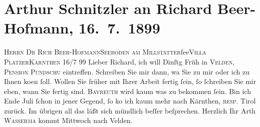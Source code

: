 

         
         \renewcommand{\erwaehntePersonen}{Personen: Richard Beer-Hofmann, Jakob Wassermann}
         \renewcommand{\erwaehnteOrte}{Orte: Bayreuth, Kärnten, Pension Pundschu, Seeboden, Tirol, Velden am Wörthersee, Villa Platzer, Wien}
         \renewcommand{\erwaehnteWerke}{}
               \section[Arthur Schnitzler an Richard Beer-Hofmann, 16. 7. 1899]{ Arthur Schnitzler an Richard Beer-Hofmann, 16. 7. 1899}\nopagebreak{}\rehead{ }\begin{ledgroupsized}[t]{13cm}\normalsize\beginnumbering{} \toendnotes[C]{\smallbreak\pagebreak[2]} 
\pstart{}{\pb}\textsc{Herrn Dr Rich Beer-Hofmann}\pend{}\pstart{}\textsc{Seeboden am Millstätter}ſee\pend{}\pstart{}\textsc{Villa Platzer}\pend{}\pstart{}\textsc{Kärnthen}\pend{}{\bigskip}\pstart
           \raggedleft{}{\pb}16/7 99\pend
           \pstart
           Lieber Richard, ich will Dinſtg{ }Früh in \textsc{Velden}, \textsc{Pension Pundschu} eintreffen. Schreiben Sie mir dann, wa{\geminationn} Sie zu mir
               oder ich zu Ihnen ko{\geminationm}en ſoll. {\pb}Wollen Sie früher mit Ihrer Arbeit fertig ſein, ſo
               ſchreiben Sie mir eben, wann Sie fertig sind.\pend
           \pstart
           \textsc{Bayreuth} wird kaum {\pb}was zu bekommen ſein.\pend
           \pstart
           Bin ich Ende Juli{ }ſchon in jener Gegend, ſo ko{\geminationm} ich kaum mehr nach Kärnthen, \textsc{resp}. Tirol zurück. Im übrigen all das läßt sich mündlich {\pb}beſſer beſprechen.\pend
           \pstart Herzlich Ihr \spacefill\mbox{Arth}\pend{}\pstart
           \textsc{Wasserma{\geminationn}} kommt Mittwoch nach Velden.\pend
           

\end{ledgroupsized}
